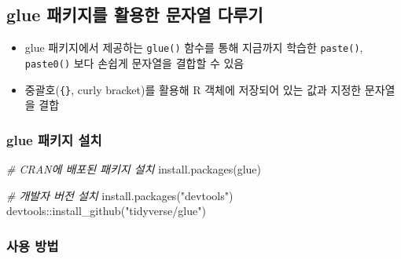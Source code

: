 \documentclass[
  11pt,
]{krantz}
\makeatletter
\newenvironment{Shaded}{\begin{snugshade}}{\end{snugshade}}
\newcommand{\CommentTok}[1]{\textcolor[rgb]{0.37,0.37,0.37}{\textit{#1}}}
\newcommand{\FunctionTok}[1]{\textcolor[rgb]{0,0,0}{#1}}
\newcommand{\NormalTok}[1]{#1}
\newcommand{\SpecialCharTok}[1]{\textcolor[rgb]{0,0,0}{#1}}
\newcommand{\StringTok}[1]{\textcolor[rgb]{0.5,0.5,0.5}{#1}}
\newenvironment{kframe}{%
\medskip{}
\setlength{\fboxsep}{.8em}
 \def\at@end@of@kframe{}%
 \ifinner\ifhmode%
  \def\at@end@of@kframe{\end{minipage}}%
  \begin{minipage}{\columnwidth}%
 \fi\fi%
 \def\FrameCommand##1{\hskip\@totalleftmargin \hskip-\fboxsep
 \colorbox{shadecolor}{##1}\hskip-\fboxsep
     \hskip-\linewidth \hskip-\@totalleftmargin \hskip\columnwidth}%
 \MakeFramed {\advance\hsize-\width
   \@totalleftmargin\z@ \linewidth\hsize
   \@setminipage}}%
 {\par\unskip\endMakeFramed%
 \at@end@of@kframe}
\newenvironment{rmdblock}[1]
  {
  \begin{itemize}
  \renewcommand{\labelitemi}{
    \raisebox{-.7\height}[0pt][0pt]{
      {\setkeys{Gin}{width=3em,keepaspectratio}\texttt{[image: images/\#1]}}
    }
  }
  \setlength{\fboxsep}{1em}
  \begin{kframe}
  \item
  }
  {
  \end{kframe}
  \end{itemize}
  }
\newenvironment{rmdtip}
  {\begin{rmdblock}{tip}}
  {\end{rmdblock}}
\makeatother
\begin{document}
\normalsize

\hypertarget{glue-uxd328uxd0a4uxc9c0uxb97c-uxd65cuxc6a9uxd55c-uxbb38uxc790uxc5f4-uxb2e4uxb8e8uxae30}{%
\subsection{glue 패키지를 활용한 문자열 다루기}\label{glue-uxd328uxd0a4uxc9c0uxb97c-uxd65cuxc6a9uxd55c-uxbb38uxc790uxc5f4-uxb2e4uxb8e8uxae30}}

\footnotesize

\begin{rmdtip}
\begin{itemize}
\item
  glue 패키지에서 제공하는 \texttt{glue()} 함수를 통해 지금까지 학습한 \texttt{paste()}, \texttt{paste0()}
  보다 손쉽게 문자열을 결합할 수 있음
\item
  중괄호(\texttt{\{\}}, curly bracket)를 활용해 R 객체에 저장되어 있는 값과 지정한 문자열을 결합
\end{itemize}
\end{rmdtip}

\normalsize

\hypertarget{glue-uxd328uxd0a4uxc9c0-uxc124uxce58}{%
\subsubsection{\texorpdfstring{\textbf{glue} 패키지 설치}{glue 패키지 설치}}\label{glue-uxd328uxd0a4uxc9c0-uxc124uxce58}}

\footnotesize

\begin{Shaded}
\begin{Highlighting}[]
\CommentTok{\# CRAN에 배포된 패키지 설치}
\FunctionTok{install.packages}\NormalTok{(}\StringTok{\textquotesingle{}glue\textquotesingle{}}\NormalTok{)}

\CommentTok{\# 개발자 버전 설치}
\FunctionTok{install.packages}\NormalTok{(}\StringTok{"devtools"}\NormalTok{)}
\NormalTok{devtools}\SpecialCharTok{::}\FunctionTok{install\_github}\NormalTok{(}\StringTok{"tidyverse/glue"}\NormalTok{)}
\end{Highlighting}
\end{Shaded}

\normalsize

\hypertarget{uxc0acuxc6a9-uxbc29uxbc95}{%
\subsubsection{\texorpdfstring{\textbf{사용 방법}}{사용 방법}}\label{uxc0acuxc6a9-uxbc29uxbc95}}
\end{document}
